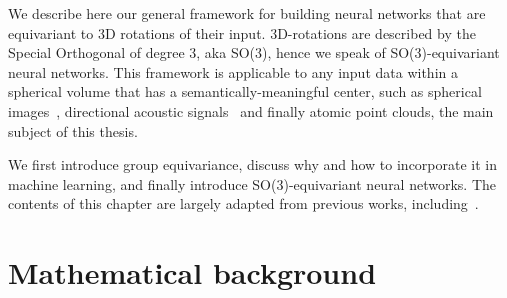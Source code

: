 

We describe here our general framework for building neural networks that are equivariant to 3D rotations 
of their input. 3D-rotations are described by the Special Orthogonal of degree 3, aka SO(3), 
hence we speak of SO(3)-equivariant neural networks.
This framework is applicable to any input data within a spherical volume that has a semantically-meaningful
center, such as spherical images~\citep{visani_holographic-vae_2024}, directional acoustic signals~\citep{miotello_analysis_2025}
and finally atomic point clouds, the main subject of this thesis.

We first introduce group equivariance, discuss why and how to incorporate it in machine learning, and finally
introduce SO(3)-equivariant neural networks. The contents of this chapter are largely adapted from
previous works, including~\citep{pun_learning_2024, thomas_tensor_2018, kondor_clebsch_2018, bronstein_geometric_2021}.


\section{Mathematical background}

